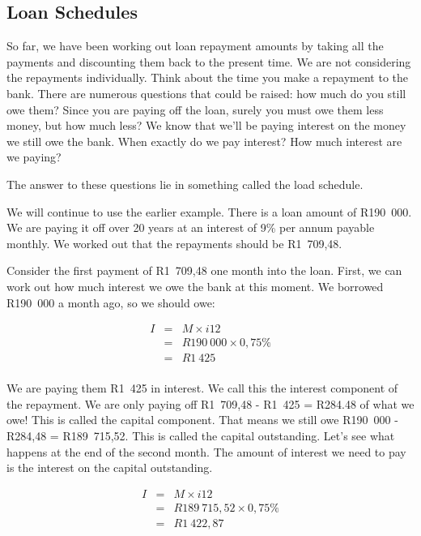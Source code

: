 \subsection{Loan Schedules}
\label{ss:loadschedules}

So far, we have been working out loan repayment amounts by taking all the payments and discounting them back to the present time. We are not considering the repayments individually. Think about the time you make a repayment to the bank. There are numerous questions that could be raised: how much do you still owe them? Since you are paying off the loan, surely you must owe them less money, but how much less? We know that we'll be paying interest on the money we still owe the bank. When exactly do we pay interest? How much interest are we paying?

The answer to these questions lie in something called the load schedule.

We will continue to use the earlier example. There is a loan amount of R190~000. We are paying it off over 20 years at an interest of 9\% per annum payable monthly. We worked out that the repayments should be R1~709,48.

Consider the first payment of R1~709,48 one month into the loan. First, we can work out how much interest we owe the bank at this moment. We borrowed R190~000 a month ago, so we should owe:

\begin{eqnarray*}
I &=& M \times i12\\
&=& R190~000 \times 0,75\%\\
&=& R1~425\\
\end{eqnarray*}

We are paying them R1~425 in interest. We call this the interest component of the repayment. We are only paying off R1~709,48 - R1~425 = R284.48 of what we owe! This is called the capital component. That means we still owe R190~000 - R284,48 = R189~715,52. This is called the capital outstanding. Let's see what happens at the end of the second month. The amount of interest we need to pay is the interest on the capital outstanding.

\begin{eqnarray*}
I &=& M \times i12\\
&=& R189~715,52 \times 0,75\%\\
&=& R1~422,87\\
\end{eqnarray*}

